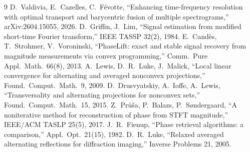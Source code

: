 \documentclass[11pt]{article}
\theoremstyle{definition}
\begin{document}
\begin{thebibliography}{9}
 D.~Valdivia, E.~Cazelles, C.~F\'evotte,
``Enhancing time-frequency resolution with optimal transport and
barycentric fusion of multiple spectrograms,'' arXiv:2604.15055, 2026.
 D.~Griffin, J.~Lim, ``Signal estimation from
modified short-time Fourier transform,'' IEEE TASSP 32(2), 1984.
 E.~Cand\`es, T.~Strohmer, V.~Voroninski,
``PhaseLift: exact and stable signal recovery from magnitude measurements
via convex programming,'' Comm.\ Pure Appl.\ Math.\ 66(8), 2013.
 A.~Lewis, D.~R.~Luke, J.~Malick, ``Local linear
convergence for alternating and averaged nonconvex projections,''
Found.\ Comput.\ Math.\ 9, 2009.
 D.~Drusvyatskiy, A.~Ioffe, A.~Lewis,
``Transversality and alternating projections for nonconvex sets,''
Found.\ Comput.\ Math.\ 15, 2015.
 Z.~Pr\r{u}\v{s}a, P.~Balazs, P.~S{\o}ndergaard,
``A noniterative method for reconstruction of phase from STFT magnitude,''
IEEE/ACM TASLP 25(5), 2017.
 J.~R.~Fienup, ``Phase retrieval algorithms: a
comparison,'' Appl.\ Opt.\ 21(15), 1982.
 D.~R.~Luke, ``Relaxed averaged alternating reflections
for diffraction imaging,'' Inverse Problems 21, 2005.
\end{thebibliography}
\end{document}
